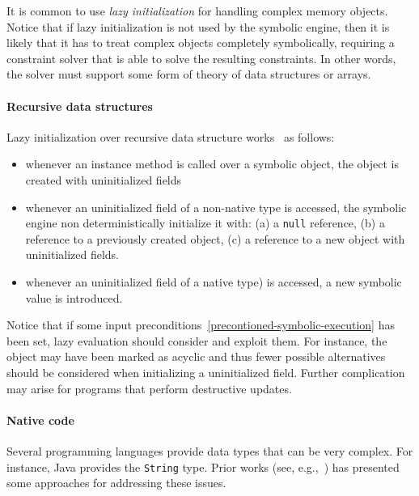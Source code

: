 It is common to use {\em lazy initialization} for handling complex memory objects. Notice that if lazy initialization is not used by the symbolic engine, then it is likely that it has to treat complex objects completely symbolically, requiring a constraint solver that is able to solve the resulting constraints. In other words, the solver must support some form of theory of data structures or arrays.

\paragraph{Recursive data structures} Lazy initialization over recursive data structure works~\cite{PV-JSTTT09} as follows:
\begin{itemize}
  \item whenever an instance method is called over a symbolic object, the object is created with uninitialized fields
  \item whenever an uninitialized field of a non-native type is accessed, the symbolic engine non deterministically initialize it with: (a) a {\tt null} reference, (b) a reference to a previously created object, (c) a reference to a new object with uninitialized fields. 
  \item whenever an uninitialized field of a native type) is accessed, a new symbolic value is introduced. 
\end{itemize}


Notice that if some input preconditions~\ref{precontioned-symbolic-execution} has been set, lazy evaluation should consider and exploit them. For instance, the object may have been marked as acyclic and thus fewer possible alternatives should be considered when initializing a uninitialized field. Further complication~\cite{PV-JSTTT09} may arise for programs that perform destructive updates. 

\paragraph{Native code} Several programming languages provide data types that can be very complex. For instance, Java provides the {\tt String} type. Prior works (see, e.g.,~\cite{SHZ-TAIC07}) has presented some approaches for addressing these issues.

